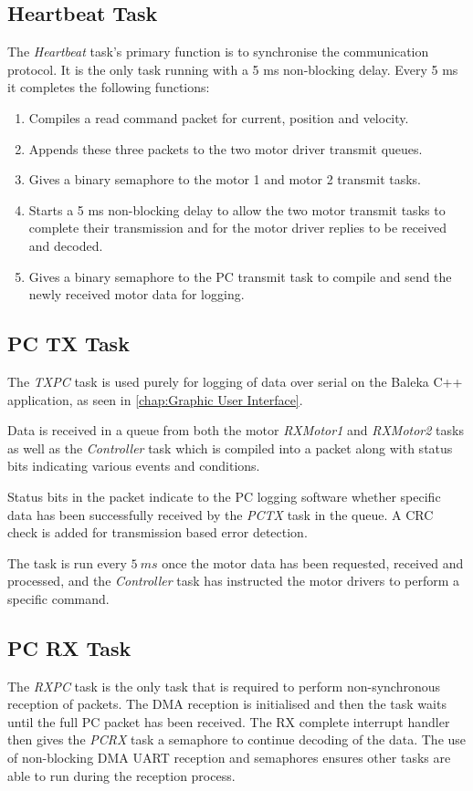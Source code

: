 \subsection{Heartbeat Task}
The \textit{Heartbeat} task's primary function is to synchronise the communication protocol. It is the only task running with a 5 ms non-blocking delay. Every 5 ms it completes the following functions:

\begin{enumerate}
\item Compiles a read command packet for current, position and velocity.
\item Appends these three packets to the two motor driver transmit queues. 
\item Gives a binary semaphore to the motor 1 and motor 2 transmit tasks.
\item Starts a 5 ms non-blocking delay to allow the two motor transmit tasks to complete their transmission and for the motor driver replies to be received and decoded.
\item Gives a binary semaphore to the PC transmit task to compile and send the newly received motor data for logging.
\end{enumerate}

\subsection{PC TX Task}
The \textit{TXPC} task is used purely for logging of data over serial on the Baleka C++ application, as seen in \cref{chap:Graphic User Interface}. 

Data is received in a queue from both the motor \textit{RXMotor1} and \textit{RXMotor2} tasks as well as the \textit{Controller} task which is compiled into a packet along with status bits indicating various events and conditions. 

Status bits in the packet indicate to the PC logging software whether specific data has been successfully received by the \textit{PCTX} task in the queue. A CRC check is added for transmission based error detection. 

The task is run every $5\ ms$ once the motor data has been requested, received and processed, and the \textit{Controller} task has instructed the motor drivers to perform a specific command. 

\subsection{PC RX Task}
The \textit{RXPC} task is the only task that is required to perform non-synchronous reception of packets. The DMA reception is initialised and then the task waits until the full PC packet has been received. The RX complete interrupt handler then gives the \textit{PCRX} task a semaphore to continue decoding of the data. The use of non-blocking DMA UART reception and semaphores ensures other tasks are able to run during the reception process.

